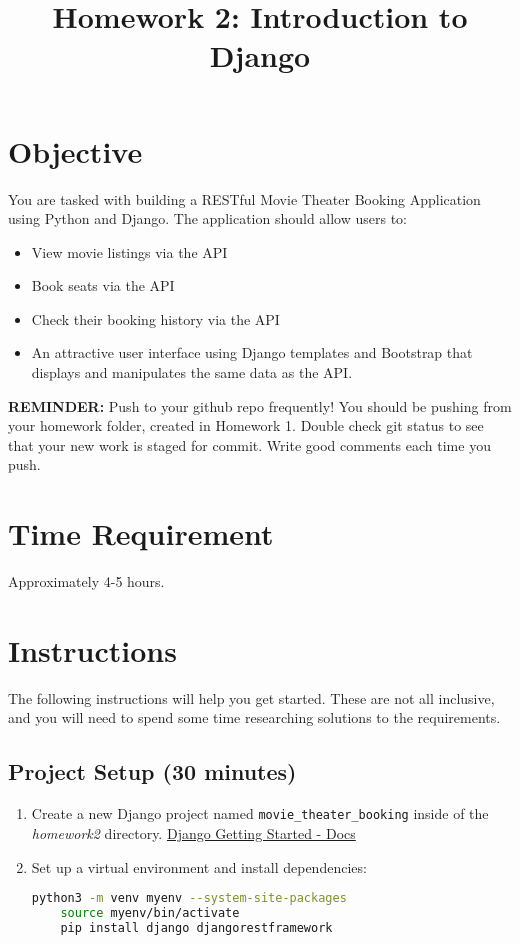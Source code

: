 \documentclass{article}
\title{Homework 2: Introduction to Django}
\author{}
\date{}
\begin{document}
\maketitle

\section{Objective}
You are tasked with building a RESTful Movie Theater Booking Application using Python and Django. The application should allow users to:

\begin{itemize}
    \item View movie listings via the API
    \item Book seats via the API
    \item Check their booking history via the API
    \item An attractive user interface using Django templates and Bootstrap that displays and manipulates the same data as the API.
\end{itemize}


\textbf{REMINDER:} Push to your github repo frequently! You should be pushing from your homework folder, created in Homework 1. Double check git status to see that your new work is staged for commit. Write good comments each time you push.

\section{Time Requirement}
Approximately 4-5 hours.

\section{Instructions}
The following instructions will help you get started. These are not all inclusive, and you will need to spend some time researching solutions to the requirements. 

\subsection{Project Setup (30 minutes)}
\begin{enumerate}
    \item Create a new Django project named \texttt{movie\_theater\_booking} inside of the \textit{homework2} directory. \href{https://docs.djangoproject.com/en/stable/intro/tutorial01/}{Django Getting Started - Docs}
    \item Set up a virtual environment and install dependencies:
    \begin{lstlisting}[style=customcode,language=bash]
    python3 -m venv myenv --system-site-packages
    source myenv/bin/activate
    pip install django djangorestframework
    \end{lstlisting}
\end{enumerate}
\end{document}
